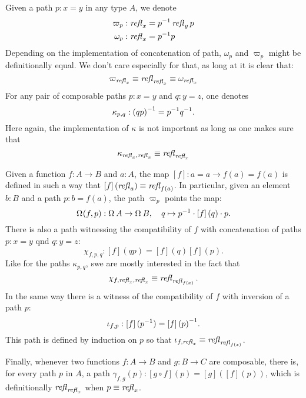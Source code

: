 \documentclass[english,a4]{article}
\renewcommand{\ap}[1]{\left[{#1}\right]}
\begin{document}
Given a path $p:x=y$ in any type $A$, we denote
\begin{align*}
  \varpi_p &: \mathop{{\mathit{refl}}_{x}} = {p}^{-1} \mathop{{\mathit{refl}}_{y}} p\\
  \omega_p &: \mathop{{\mathit{refl}}_{x}} = {p}^{-1} p
\end{align*}
Depending on the implementation of concatenation of path, $\omega_p$ and $\varpi_p$
might be definitionally equal. We don't care especially for that, as long at it
is clear that:
\begin{displaymath}
  \varpi_{\mathop{{\mathit{refl}}_{x}}} \equiv \mathop{{\mathit{refl}}_{\mathop{{\mathit{refl}}_{x}}}} \equiv \omega_{\mathop{{\mathit{refl}}_{x}}}  
\end{displaymath}
For any pair of composable paths $p: x=y$ and $q: y=z$, one denotes
\begin{displaymath}
  \kappa_{p,q} : {(qp)}^{-1} = {p}^{-1} {q}^{-1}.
\end{displaymath}
Here again, the implementation of $\kappa$ is not important as long as one
makes sure that
\begin{displaymath}
  \kappa_{\mathop{{\mathit{refl}}_{x}},\mathop{{\mathit{refl}}_{x}}} \equiv  \mathop{{\mathit{refl}}_{\mathop{{\mathit{refl}}_{x}}}}
\end{displaymath}

Given a function $f:A\to B$ and $a:A$, the map $\ap f : a=a
\to f(a)=f(a)$ is defined in such a way that $\ap f (\refl a) \jdeq \refl
{f(a)}$. In particular, given an element $b:B$ and a path $p:b=f(a)$, the path
$\varpi_p$ points the map:
\begin{displaymath}
  \loopspace\null (f,p) : \loopspace \null A \to \loopspace\null B, \quad
  q \mapsto \inv p \cdot \ap f(q) \cdot p.
\end{displaymath}
There is also a path witnessing the compatibility of $f$ with concatenation of
paths $p:x=y$ qnd $q:y=z$:
\begin{displaymath}
  \chi_{f,p,q} : \ap f (qp) = \ap f (q) \ap f (p).
\end{displaymath}
Like for the paths $\kappa_{p,q}$, swe are mostly interested in the fact that 
\begin{displaymath}
  \chi_{f,\mathop{{\mathit{refl}}_{x}},\mathop{{\mathit{refl}}_{x}}} \equiv \mathop{{\mathit{refl}}_{\mathop{{\mathit{refl}}_{f(x)}}}}.
\end{displaymath}
In the same way there is a witness of the compatibility of $f$ with inversion of
a path $p$:
\begin{displaymath}
  \iota_{f,p} : \ap f(\inv p) = \inv {\ap f (p)}.
\end{displaymath}
This path is defined by induction on $p$ so that $\iota_{f,\mathop{{\mathit{refl}}_{x}}} \equiv
\mathop{{\mathit{refl}}_{\mathop{{\mathit{refl}}_{f(x)}}}}$.

Finally, whenever two functions $f:A\to B$ and $g:B\to C$ are composable, there
is, for every path $p$ in $A$, a path $\gamma_{f,g}(p) : \ap{g\circ f}(p) = \ap
g (\ap f (p))$, which is definitionally $\mathop{{\mathit{refl}}_{\mathop{{\mathit{refl}}_{x}}}}$ when $p \equiv \mathop{{\mathit{refl}}_{x}}$.
\end{document}
